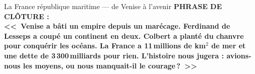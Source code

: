 \documentclass[a4paper,11pt]{article}
\begin{document}
\begin{fichevert}{La France r\'{e}publique maritime --- de Venise \`{a} l'avenir}
\vspace{0.3cm}
\textbf{\color{ModeVert}PHRASE DE CL\^{O}TURE :}\\
\textbf{\textcolor{ModeVert}{<<~Venise a b\^{a}ti un empire depuis un mar\'{e}cage. Ferdinand de Lesseps a coup\'{e} un continent en deux. Colbert a plant\'{e} du chanvre pour conqu\'{e}rir les oc\'{e}ans. La France a 11\,millions de km$^2$ de mer et une dette de 3\,300\,milliards pour rien. L'histoire nous jugera : avions-nous les moyens, ou nous manquait-il le courage\,?~>>}}

\end{fichevert}

\newpage

\end{document}
